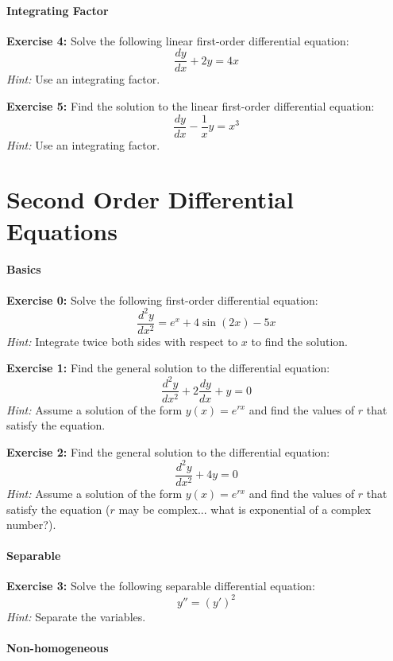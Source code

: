 \documentclass[]{article}
\begin{document}
	\paragraph{Integrating Factor}\mbox{}
	
	\textbf{Exercise 4:}
	Solve the following linear first-order differential equation:
	\[
	\frac{dy}{dx} + 2y = 4x
	\]
	\textit{Hint:} Use an integrating factor.
	
	\textbf{Exercise 5:}
	Find the solution to the linear first-order differential equation:
	\[
	\frac{dy}{dx} - \frac{1}{x}y = x^3
	\]
	\textit{Hint:} Use an integrating factor.
	
	
	
	\section{Second Order Differential Equations}
	\paragraph{Basics}\mbox{}
	
	\textbf{Exercise 0:}
	Solve the following first-order differential equation:
	\[
	\frac{d^2y}{dx^2} = e^x + 4\sin(2x) - 5x
	\]
	\textit{Hint:} Integrate twice both sides with respect to \(x\) to find the solution.
	
	\textbf{Exercise 1:}
	Find the general solution to the differential equation:
	\[
	\frac{d^2y}{dx^2} + 2\frac{dy}{dx} + y = 0
	\]
	\textit{Hint:} Assume a solution of the form \(y(x) = e^{rx}\) and find the values of \(r\) that satisfy the equation.
	
	\textbf{Exercise 2:}
	Find the general solution to the differential equation:
	\[
	\frac{d^2y}{dx^2} + 4y = 0
	\]
	\textit{Hint:} Assume a solution of the form \(y(x) = e^{rx}\) and find the values of \(r\) that satisfy the equation ($r$ may be complex... what is exponential of a complex number?).
	
	\paragraph{Separable}\mbox{}
	
	\textbf{Exercise 3:}
	Solve the following separable differential equation:
	$$y'' = (y')^2$$
	\textit{Hint:} Separate the variables.
	
	\paragraph{Non-homogeneous}\mbox{}
	
\end{document}
